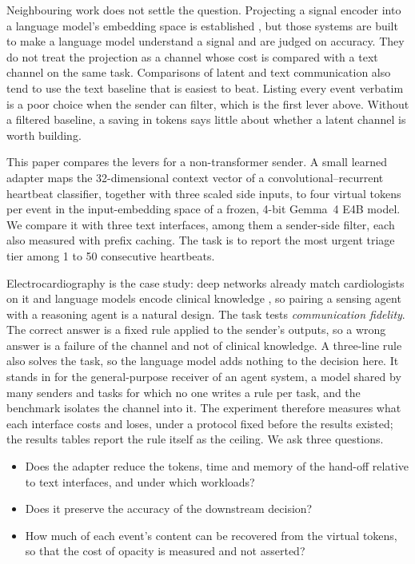 Neighbouring work does not settle the question. Projecting a signal encoder into a language model's embedding space is established \cite{jin2024timellm,babu2025modality,zhao2025ecgchat,zhang2025sensorlm}, but those systems are built to make a language model understand a signal and are judged on accuracy. They do not treat the projection as a channel whose cost is compared with a text channel on the same task. Comparisons of latent and text communication also tend to use the text baseline that is easiest to beat. Listing every event verbatim is a poor choice when the sender can filter, which is the first lever above. Without a filtered baseline, a saving in tokens says little about whether a latent channel is worth building.

This paper compares the levers for a non-transformer sender. A small learned adapter maps the 32-dimensional context vector of a convolutional--recurrent heartbeat classifier, together with three scaled side inputs, to four virtual tokens per event in the input-embedding space of a frozen, 4-bit Gemma~4 E4B model. We compare it with three text interfaces, among them a sender-side filter, each also measured with prefix caching. The task is to report the most urgent triage tier among 1 to 50 consecutive heartbeats.

Electrocardiography is the case study: deep networks already match cardiologists on it \cite{hannun2019cardiologist} and language models encode clinical knowledge \cite{singhal2023large}, so pairing a sensing agent with a reasoning agent is a natural design. The task tests \emph{communication fidelity}. The correct answer is a fixed rule applied to the sender's outputs, so a wrong answer is a failure of the channel and not of clinical knowledge. A three-line rule also solves the task, so the language model adds nothing to the decision here. It stands in for the general-purpose receiver of an agent system, a model shared by many senders and tasks for which no one writes a rule per task, and the benchmark isolates the channel into it. The experiment therefore measures what each interface costs and loses, under a protocol fixed before the results existed; the results tables report the rule itself as the ceiling. We ask three questions.
\begin{itemize}
\item Does the adapter reduce the tokens, time and memory of the hand-off relative to text interfaces, and under which workloads?
\item Does it preserve the accuracy of the downstream decision?
\item How much of each event's content can be recovered from the virtual tokens, so that the cost of opacity is measured and not asserted?
\end{itemize}

